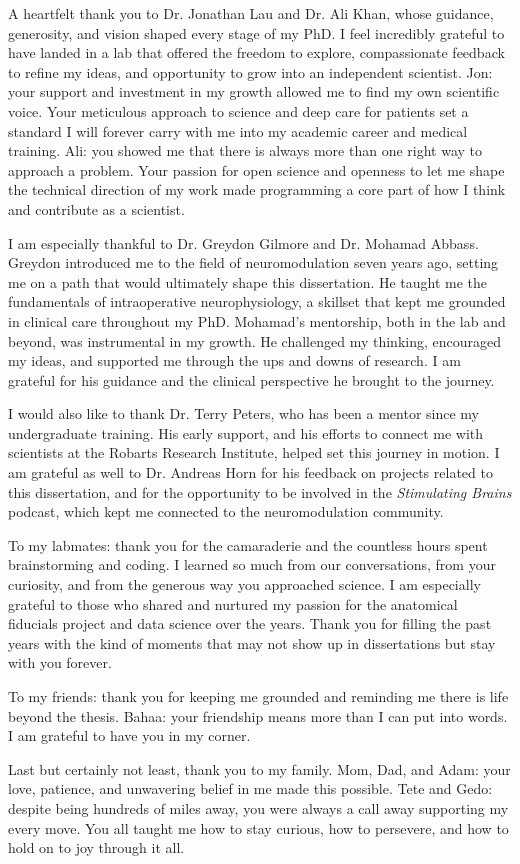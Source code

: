 \onehalfspacing
A heartfelt thank you to Dr. Jonathan Lau and Dr. Ali Khan, whose guidance, generosity, and vision shaped every stage of my PhD. I feel incredibly grateful to have landed in a lab that offered the freedom to explore, compassionate feedback to refine my ideas, and opportunity to grow into an independent scientist. Jon: your support and investment in my growth allowed me to find my own scientific voice. Your meticulous approach to science and deep care for patients set a standard I will forever carry with me into my academic career and medical training. Ali: you showed me that there is always more than one right way to approach a problem. Your passion for open science and openness to let me shape the technical direction of my work made programming a core part of how I think and contribute as a scientist.

I am especially thankful to Dr. Greydon Gilmore and Dr. Mohamad Abbass. Greydon introduced me to the field of neuromodulation seven years ago, setting me on a path that would ultimately shape this dissertation. He taught me the fundamentals of intraoperative neurophysiology, a skillset that kept me grounded in clinical care throughout my PhD. Mohamad’s mentorship, both in the lab and beyond, was instrumental in my growth. He challenged my thinking, encouraged my ideas, and supported me through the ups and downs of research. I am grateful for his guidance and the clinical perspective he brought to the journey.

I would also like to thank Dr. Terry Peters, who has been a mentor since my undergraduate training. His early support, and his efforts to connect me with scientists at the Robarts Research Institute, helped set this journey in motion. I am grateful as well to Dr. Andreas Horn for his feedback on projects related to this dissertation, and for the opportunity to be involved in the \textit{Stimulating Brains} podcast, which kept me connected to the neuromodulation community.

To my labmates: thank you for the camaraderie and the countless hours spent brainstorming and coding. I learned so much from our conversations, from your curiosity, and from the generous way you approached science. I am especially grateful to those who shared and nurtured my passion for the anatomical fiducials project and data science over the years. Thank you for filling the past years with the kind of moments that may not show up in dissertations but stay with you forever.

To my friends: thank you for keeping me grounded and reminding me there is life beyond the thesis. Bahaa: your friendship means more than I can put into words. I am grateful to have you in my corner.

Last but certainly not least, thank you to my family. Mom, Dad, and Adam: your love, patience, and unwavering belief in me made this possible. Tete and Gedo: despite being hundreds of miles away, you were always a call away supporting my every move. You all taught me how to stay curious, how to persevere, and how to hold on to joy through it all.